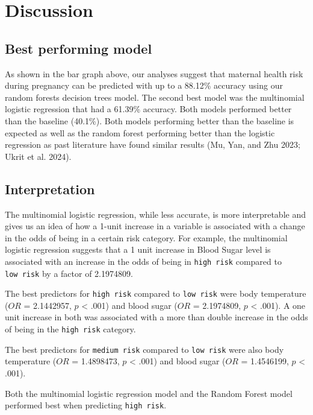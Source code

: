 \documentclass[
  letterpaper,
  DIV=11,
  numbers=noendperiod]{scrartcl}
\begin{document}
\section{Discussion}\label{discussion}

\subsection{Best performing model}\label{best-performing-model}

As shown in the bar graph above, our analyses suggest that maternal
health risk during pregnancy can be predicted with up to a 88.12\%
accuracy using our random forests decision trees model. The second best
model was the multinomial logistic regression that had a 61.39\%
accuracy. Both models performed better than the baseline (40.1\%). Both
models performing better than the baseline is expected as well as the
random forest performing better than the logistic regression as past
literature have found similar results (Mu, Yan, and Zhu 2023; Ukrit et
al. 2024).

\subsection{Interpretation}\label{interpretation}

The multinomial logistic regression, while less accurate, is more
interpretable and gives us an idea of how a 1-unit increase in a
variable is associated with a change in the odds of being in a certain
risk category. For example, the multinomial logistic regression suggests
that a 1 unit increase in Blood Sugar level is associated with an
increase in the odds of being in \texttt{high\ risk} compared to
\texttt{low\ risk} by a factor of 2.1974809.

The best predictors for \texttt{high\ risk} compared to
\texttt{low\ risk} were body temperature (\(OR\) = 2.1442957, \(p\)
\textless{} .001) and blood sugar (\(OR\) = 2.1974809, \(p\) \textless{}
.001). A one unit increase in both was associated with a more than
double increase in the odds of being in the \texttt{high\ risk}
category.

The best predictors for \texttt{medium\ risk} compared to
\texttt{low\ risk} were also body temperature (\(OR\) = 1.4898473, \(p\)
\textless{} .001) and blood sugar (\(OR\) = 1.4546199, \(p\) \textless{}
.001).

Both the multinomial logistic regression model and the Random Forest
model performed best when predicting \texttt{high\ risk}.
\end{document}
